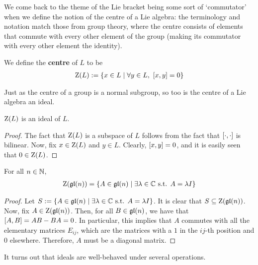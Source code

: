 We come back to the theme of the Lie bracket being some sort of `commutator' when we define the notion of the centre of a Lie algebra: the terminology and notation match those from group theory, where the centre consists of elements that commute with every other element of the group (making its commutator with every other element the identity).

\begin{boxdefinition}
    We define the \textbf{centre} of $L$ to be
    \begin{align*}
        \operatorname{Z}\!\left( L \right) := \left\{ x \in L \; \middle\vert \; \forall y \in L, \ \left[ x, y \right] = 0 \right\}
    \end{align*}
\end{boxdefinition}

Just as the centre of a group is a normal subgroup, so too is the centre of a Lie algebra an ideal.

\begin{boxlemma}
    $\operatorname{Z}\!\left( L \right)$ is an ideal of $L$.
\end{boxlemma}
\begin{proof}
    The fact that $\operatorname{Z}\!\left( L \right)$ is a subspace of $L$ follows from the fact that $\left[ \cdot, \cdot \right]$ is bilinear. Now, fix $x \in \operatorname{Z}\!\left( L \right)$ and $y \in L$. Clearly, $\left[ x, y \right] = 0$, and it is easily seen that $0 \in \operatorname{Z}\!\left( L \right)$.
\end{proof}

\begin{boxexample}
    For all $n \in \mathbb{N}$,
    \begin{align*}
        \operatorname{Z}\!\left( \mathfrak{gl}\!\left( n \right) \right) = \left\{ A \in \mathfrak{gl}\!\left( n \right) \; \middle\vert \; \exists \lambda \in \mathbb{C} \text{ s.t. } A = \lambda I \right\}
    \end{align*}
    \begin{proof}
        Let $S := \left\{ A \in \mathfrak{gl}\!\left( n \right) \; \middle\vert \; \exists \lambda \in \mathbb{C} \text{ s.t. } A = \lambda I \right\}$. It is clear that $S \subseteq \operatorname{Z}\!\left( \mathfrak{gl}\!\left( n \right) \right)$. Now, fix $A \in \operatorname{Z}\!\left( \mathfrak{gl}\!\left( n \right) \right)$. Then, for all $B \in \mathfrak{gl}\!\left( n \right)$, we have that $\left[ A, B \right] = AB - BA = 0$. In particular, this implies that $A$ commutes with all the elementary matrices $E_{ij}$, which are the matrices with a $1$ in the $ij$-th position and $0$ elsewhere. Therefore, $A$ must be a diagonal matrix. 
    \end{proof}
\end{boxexample}

It turns out that ideals are well-behaved under several operations.


